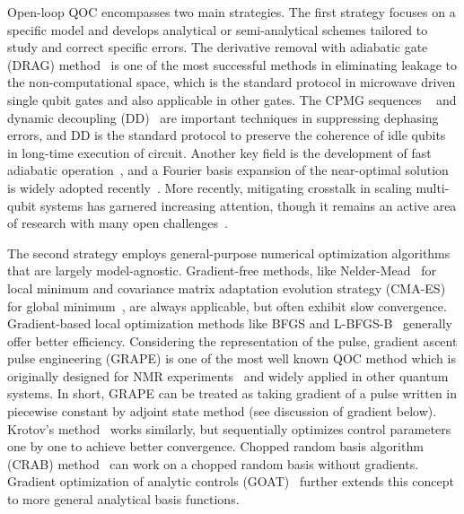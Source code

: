 \documentclass[a4paper,onecolumn,11pt,unpublished]{quantumarticle}
\begin{document}
Open-loop QOC encompasses two main strategies. The first strategy focuses on a specific model and develops analytical or semi-analytical schemes tailored to study and correct specific errors. The derivative removal with adiabatic gate (DRAG) method~\cite{Gambetta2011Analytic} is one of the most successful methods in eliminating leakage to the non-computational space, which is the standard protocol in microwave driven single qubit gates and also applicable in other gates. The CPMG sequences ~\cite{Carr1954Effects,Meiboom1958Modified,Uhrig2007Keeping,Uhrig2011Exact} and dynamic decoupling (DD)~\cite{Viola1999Dynamical,Zanardi1999Symmetrizing,Vitali1999Using,Vitali2002Mirror,Khodjasteh2005FaultTolerant,Witzel2007Multiplepulse,Lidar2014Review} are important techniques in suppressing dephasing errors, and DD is the standard protocol to preserve the coherence of idle qubits in long-time execution of circuit. Another key field is the development of fast adiabatic operation~\cite{Chen2010Transient,delCampo2013Shortcuts,Demirplak2003Adiabatic,Martinis2014Fast}, and a Fourier basis expansion of the near-optimal solution is widely adopted recently~\cite{Martinis2014Fast}. More recently, mitigating crosstalk in scaling multi-qubit systems has garnered increasing attention, though it remains an active area of research with many open challenges~\cite{Hortensius2015Pulse,Gambetta2012Characterization,Barends2014Superconducting,Huang2020Alibaba,Takita2017Experimental,Mundada2019Suppression,Dai2021Calibration,Xie2022Suppressing,Tripathi2022Suppression,Niu2021Analyzing,Zhao2022Quantum,Ni2024Superconducting}.

The second strategy employs general-purpose numerical optimization algorithms that are largely model-agnostic. Gradient-free methods, like Nelder-Mead~\cite{Nelder1965A} for local minimum and covariance matrix adaptation evolution strategy (CMA-ES) for global minimum~\cite{Beyer2002Evolution}, are always applicable, but often exhibit slow convergence. Gradient-based local optimization methods like BFGS and L-BFGS-B~\cite{Zhu1997Algorithm,Morales2011Remark} generally offer better efficiency. Considering the representation of the pulse, gradient ascent pulse engineering (GRAPE) is one of the most well known QOC method which is originally designed for NMR experiments~\cite{Khaneja2005Optimal} and widely applied in other quantum systems. In short, GRAPE can be treated as taking gradient of a pulse written in piecewise constant by adjoint state method (see discussion of gradient below). Krotov's method~\cite{Reich2012Monotonically,Sklarz2002Loading} works similarly, but sequentially optimizes control parameters one by one to achieve better convergence. Chopped random basis algorithm (CRAB) method~\cite{Caneva2011Chopped,Doria2011Optimal,Rach2015Dressing,Muller2022One} can work on a chopped random basis without gradients. Gradient optimization of analytic controls (GOAT)~\cite{Machnes2018Tunable} further extends this concept to more general analytical basis functions.
\end{document}
